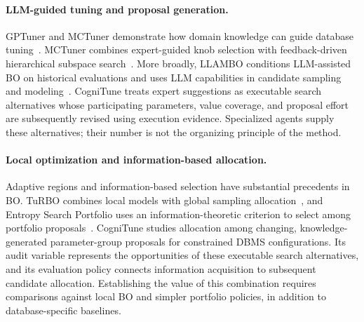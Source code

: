 \paragraph{LLM-guided tuning and proposal generation.}
GPTuner and MCTuner demonstrate how domain knowledge can guide database tuning~\cite{gptuner,mctuner}. MCTuner combines expert-guided knob selection with feedback-driven hierarchical subspace search~\cite{mctuner}. More broadly, LLAMBO conditions LLM-assisted BO on historical evaluations and uses LLM capabilities in candidate sampling and modeling~\cite{llambo}. CogniTune treats expert suggestions as executable search alternatives whose participating parameters, value coverage, and proposal effort are subsequently revised using execution evidence. Specialized agents supply these alternatives; their number is not the organizing principle of the method.

\paragraph{Local optimization and information-based allocation.}
Adaptive regions and information-based selection have substantial precedents in BO. TuRBO combines local models with global sampling allocation~\cite{turbo}, and Entropy Search Portfolio uses an information-theoretic criterion to select among portfolio proposals~\cite{esp}. CogniTune studies allocation among changing, knowledge-generated parameter-group proposals for constrained DBMS configurations. Its audit variable represents the opportunities of these executable search alternatives, and its evaluation policy connects information acquisition to subsequent candidate allocation. Establishing the value of this combination requires comparisons against local BO and simpler portfolio policies, in addition to database-specific baselines.
